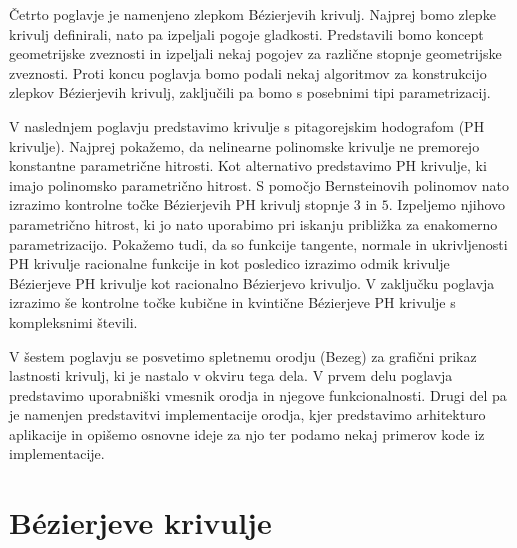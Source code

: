\documentclass[isrm2, tisk]{fmfdelo}
\begin{document}
    Četrto poglavje je namenjeno zlepkom Bézierjevih krivulj.
    Najprej bomo zlepke krivulj definirali, nato pa izpeljali pogoje gladkosti.
    Predstavili bomo koncept geometrijske zveznosti in izpeljali nekaj pogojev za različne stopnje geometrijske zveznosti.
    Proti koncu poglavja bomo podali nekaj algoritmov za konstrukcijo zlepkov Bézierjevih krivulj, zaključili pa bomo s posebnimi tipi parametrizacij.

    V naslednjem poglavju predstavimo krivulje s pitagorejskim hodografom (PH krivulje).
    Najprej pokažemo, da nelinearne polinomske krivulje ne premorejo konstantne parametrične hitrosti.
    Kot alternativo predstavimo PH krivulje, ki imajo polinomsko parametrično hitrost.
    S pomočjo Bernsteinovih polinomov nato izrazimo kontrolne točke Bézierjevih PH krivulj stopnje $3$ in $5$.
    Izpeljemo njihovo parametrično hitrost, ki jo nato uporabimo pri iskanju približka za enakomerno parametrizacijo.
    Pokažemo tudi, da so funkcije tangente, normale in ukrivljenosti PH krivulje racionalne funkcije in kot posledico izrazimo odmik krivulje Bézierjeve PH krivulje kot racionalno Bézierjevo krivuljo.
    V zaključku poglavja izrazimo še kontrolne točke kubične in kvintične Bézierjeve PH krivulje s kompleksnimi števili.

    V šestem poglavju se posvetimo spletnemu orodju (Bezeg) za grafični prikaz lastnosti krivulj, ki je nastalo v okviru tega dela.
    V prvem delu poglavja predstavimo uporabniški vmesnik orodja in njegove funkcionalnosti.
    Drugi del pa je namenjen predstavitvi implementacije orodja, kjer predstavimo arhitekturo aplikacije in opišemo osnovne ideje za njo ter podamo nekaj primerov kode iz implementacije.


    \section{Bézierjeve krivulje}\label{sec:bezierjeve-krivulje}
\end{document}
